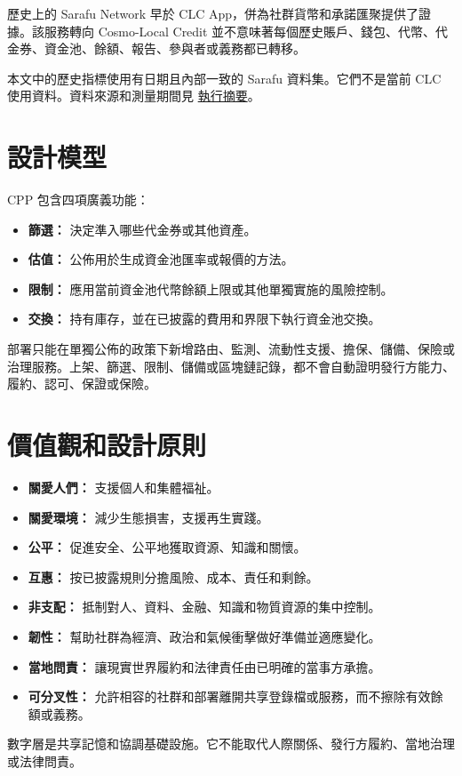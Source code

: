 \documentclass[11pt]{article}
\begin{document}
歷史上的 Sarafu Network 早於 CLC App，併為社群貨幣和承諾匯聚提供了證據。該服務轉向 Cosmo-Local Credit 並不意味著每個歷史賬戶、錢包、代幣、代金券、資金池、餘額、報告、參與者或義務都已轉移。

本文中的歷史指標使用有日期且內部一致的 Sarafu 資料集。它們不是當前 CLC 使用資料。資料來源和測量期間見 \href{https://docs.cosmolocal.credit/zh-Hant/white-paper/executive-summary}{執行摘要}。

\section*{設計模型}

CPP 包含四項廣義功能：

\begin{itemize}[leftmargin=*]
\item \textbf{篩選：} 決定準入哪些代金券或其他資產。
\item \textbf{估值：} 公佈用於生成資金池匯率或報價的方法。
\item \textbf{限制：} 應用當前資金池代幣餘額上限或其他單獨實施的風險控制。
\item \textbf{交換：} 持有庫存，並在已披露的費用和界限下執行資金池交換。
\end{itemize}
部署只能在單獨公佈的政策下新增路由、監測、流動性支援、擔保、儲備、保險或治理服務。上架、篩選、限制、儲備或區塊鏈記錄，都不會自動證明發行方能力、履約、認可、保證或保險。

\section*{價值觀和設計原則}

\begin{itemize}[leftmargin=*]
\item \textbf{關愛人們：} 支援個人和集體福祉。
\item \textbf{關愛環境：} 減少生態損害，支援再生實踐。
\item \textbf{公平：} 促進安全、公平地獲取資源、知識和關懷。
\item \textbf{互惠：} 按已披露規則分擔風險、成本、責任和剩餘。
\item \textbf{非支配：} 抵制對人、資料、金融、知識和物質資源的集中控制。
\item \textbf{韌性：} 幫助社群為經濟、政治和氣候衝擊做好準備並適應變化。
\item \textbf{當地問責：} 讓現實世界履約和法律責任由已明確的當事方承擔。
\item \textbf{可分叉性：} 允許相容的社群和部署離開共享登錄檔或服務，而不擦除有效餘額或義務。
\end{itemize}
數字層是共享記憶和協調基礎設施。它不能取代人際關係、發行方履約、當地治理或法律問責。
\end{document}
